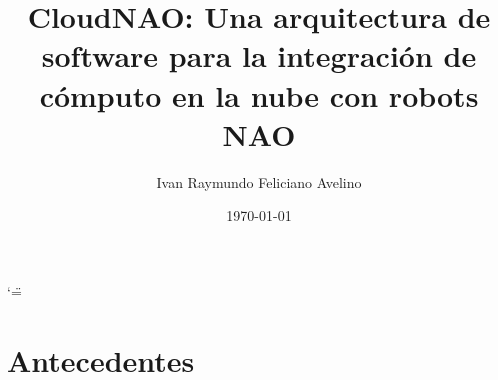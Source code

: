 \documentclass[letterpaper,12pt,spanish]{report}
\title{CloudNAO: Una arquitectura de software para la integración de
cómputo en la nube con robots NAO}
\date{\today}
\author{Ivan Raymundo Feliciano Avelino}
\begin{document}
\ifnum\catcode`\"=\active{}\fi
\maketitle
\sphinxtableofcontents








\chapter{Antecedentes}
\label{\detokenize{chapter_one:antecedentes}}\label{\detokenize{chapter_one::doc}}










% 
% 
% 
% 
% 
% 
% 
% 
\end{document}
